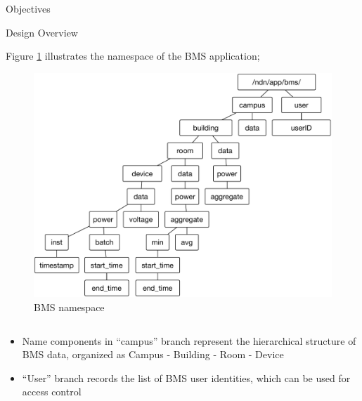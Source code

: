 \documentclass[final,hyperref={pdfpagelabels=false},20pt]{beamer}
\begin{document}
\begin{frame}[t]
\begin{columns}[t]
\begin{column}{.465\textwidth}
\begin{block}{Objectives}

\end{block}


\begin{block}{Design Overview}

Figure \ref{fig:namespace} illustrates the namespace of the BMS application;

\begin{figure}
\includegraphics[width=0.9\linewidth]{bms-namespace-update-Sep19}
\caption{BMS namespace}
\label{fig:namespace}
\end{figure}

\begin{columns}[T]

\begin{column}{.42\textwidth}
\begin{itemize}
\item{Name components in ``campus'' branch represent the hierarchical structure of BMS data, organized as Campus - Building - Room - Device}
\item{``User'' branch records the list of BMS user identities, which can be used for access control}
\end{itemize}
\end{column}


\end{columns}
\end{block}
\end{column}
\end{columns}
\end{frame}
\end{document}
